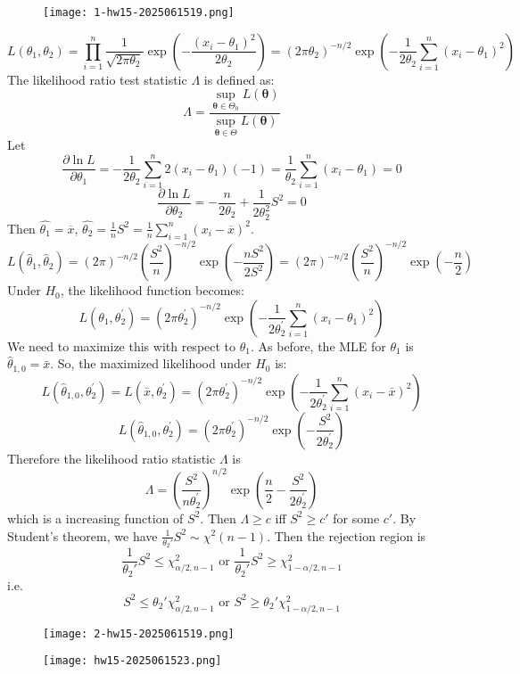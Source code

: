 \begin{exercise}
\begin{figure}[H]
\centering
\texttt{[image: 1-hw15-2025061519.png]}
\label{}
\end{figure}
\end{exercise}
\[
L\left(\theta_1, \theta_2\right)=\prod_{i=1}^n \frac{1}{\sqrt{2 \pi \theta_2}} \exp \left(-\frac{\left(x_i-\theta_1\right)^2}{2 \theta_2}\right)=\left(2 \pi \theta_2\right)^{-n / 2} \exp \left(-\frac{1}{2 \theta_2} \sum_{i=1}^n\left(x_i-\theta_1\right)^2\right)
\]
The likelihood ratio test statistic $\Lambda$ is defined as:
\[
\Lambda=\frac{\sup_{\boldsymbol{\theta}\in\Theta_0}L(\boldsymbol{\theta})}{\sup_{\boldsymbol{\theta}\in\Theta}L(\boldsymbol{\theta})}
\]
Let
\[
\frac{\partial \ln L}{\partial \theta_1}=-\frac{1}{2 \theta_2} \sum_{i=1}^n 2\left(x_i-\theta_1\right)(-1)=\frac{1}{\theta_2} \sum_{i=1}^n\left(x_i-\theta_1\right)=0
\]
\[
\frac{\partial \ln L}{\partial \theta_2}=-\frac{n}{2 \theta_2}+\frac{1}{2 \theta_2^2} S^2=0
\]
Then $\widehat{\theta_1}=\overline{x}$, $\widehat{\theta_2}=\frac{1}{n}S^{2}=\frac{1}{n}\sum_{i=1}^{n}(x_i-\overline{x})^{2}$.
\[
L\left(\hat{\theta}_1, \hat{\theta}_2\right)=(2 \pi)^{-n / 2}\left(\frac{S^2}{n}\right)^{-n / 2} \exp \left(-\frac{n S^2}{2 S^2}\right)=(2 \pi)^{-n / 2}\left(\frac{S^2}{n}\right)^{-n / 2} \exp \left(-\frac{n}{2}\right)
\]
Under $H_0$, the likelihood function becomes:
\[
L\left(\theta_1, \theta_2^{\prime}\right)=\left(2 \pi \theta_2^{\prime}\right)^{-n / 2} \exp \left(-\frac{1}{2 \theta_2^{\prime}} \sum_{i=1}^n\left(x_i-\theta_1\right)^2\right)
\]
We need to maximize this with respect to $\theta_1$. As before, the MLE for $\theta_1$ is $\hat{\theta}_{1,0}=\bar{x}$. So, the maximized likelihood under $H_0$ is:
\[
L\left(\hat{\theta}_{1,0}, \theta_2^{\prime}\right)=L\left(\bar{x}, \theta_2^{\prime}\right)=\left(2 \pi \theta_2^{\prime}\right)^{-n / 2} \exp \left(-\frac{1}{2 \theta_2^{\prime}} \sum_{i=1}^n\left(x_i-\bar{x}\right)^2\right)
\]
\[
L\left(\hat{\theta}_{1,0}, \theta_2^{\prime}\right)=\left(2 \pi \theta_2^{\prime}\right)^{-n / 2} \exp \left(-\frac{S^2}{2 \theta_2^{\prime}}\right)
\]
Therefore the likelihood ratio statistic $\Lambda$ is
\[
\Lambda=\left(\frac{S^2}{n \theta_2^{\prime}}\right)^{n / 2} \exp \left(\frac{n}{2}-\frac{S^2}{2 \theta_2^{\prime}}\right)
\]
which is a increasing function of $S^{2}$. Then $\Lambda\geq c$ iff $S^{2}\geq c'$ for some $c'$. By Student's theorem, we have $\frac{1}{\theta_2'}S^{2}\sim \chi^{2}(n-1)$. Then the rejection region is
\[
\frac{1}{\theta_2'}S^{2}\leq \chi^{2}_{\alpha/2,n-1}\text{ or }\frac{1}{\theta_2'}S^{2}\geq \chi^{2}_{1-\alpha/2,n-1}
\]
i.e.
\[
S^{2}\leq \theta_2'\chi^{2}_{\alpha/2,n-1}\text{ or }S^{2}\geq \theta_2'\chi^{2}_{1-\alpha/2,n-1}
\]
\begin{exercise}
\begin{figure}[H]
\centering
\texttt{[image: 2-hw15-2025061519.png]}
\label{}
\end{figure}
\end{exercise}
\begin{figure}[H]
\centering
\texttt{[image: hw15-2025061523.png]}
\label{}
\end{figure}

